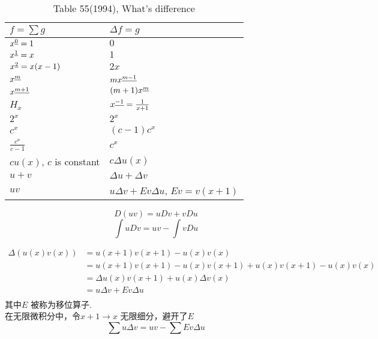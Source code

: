 \begin{table}[htbp]
	\centering
	\small
	\caption{Table 55(1994), What's difference}
	\begin{tabular}{l|l}
		\toprule
        $ f=\sum g $ & $ \Delta f= g $ \\
		\midrule
        $ x^{\underline{0}}=1 $ & $ 0 $ \\
        $ x^{\underline{1}}=x $ & $ 1 $ \\
        $ x^{\underline{2}}=x(x-1) $ & $ 2x $ \\
        $ x^{\underline{m}}   $ & $ m x^{\underline{m-1}} $ \\
        $ x^{\underline{m+1}} $ & $ (m+1) x^{\underline{m}} $ \\
        $ H_x $ & $ x^{\underline{-1}}=\frac{1}{x+1} $ \\
        $ 2^x $ & $ 2^x $ \\
        $ c^x $ & $ (c-1) c^x $ \\
        $ \frac{c^x}{c-1} $ & $  c^x $ \\
        $ cu(x) $, $ c $ is constant  & $ c\Delta u(x) $ \\
        $ u+v $ & $ \Delta u+\Delta v $ \\
        $ uv $ & $ u\Delta v+Ev \Delta u $, $ Ev=v(x+1) $  \\
		\bottomrule
	\end{tabular}%
	\label{tab:55rightside}%
\end{table}%
\begin{equation}
    D(uv)=uDv+vDu
\end{equation}
\begin{equation}
    \int uDv = uv - \int vDu
\end{equation}

\begin{equation}
    \begin{array}{rl}
        \Delta (u(x)v(x))
        &=u(x+1)v(x+1)-u(x)v(x)\\
        &=u(x+1)v(x+1)-u(x)v(x+1)+u(x)v(x+1) -u(x)v(x)\\
        &=\Delta u(x)v(x+1)+u(x)\Delta v(x)\\
        &=u\Delta v+Ev \Delta u\\
    \end{array}
\end{equation}
其中$ E $ 被称为移位算子.\\
在无限微积分中，令$ x+1 \rightarrow x $ 无限细分，避开了$ E $ 
\begin{equation}
    \sum u\Delta v = uv - \sum Ev \Delta u
\end{equation} 

